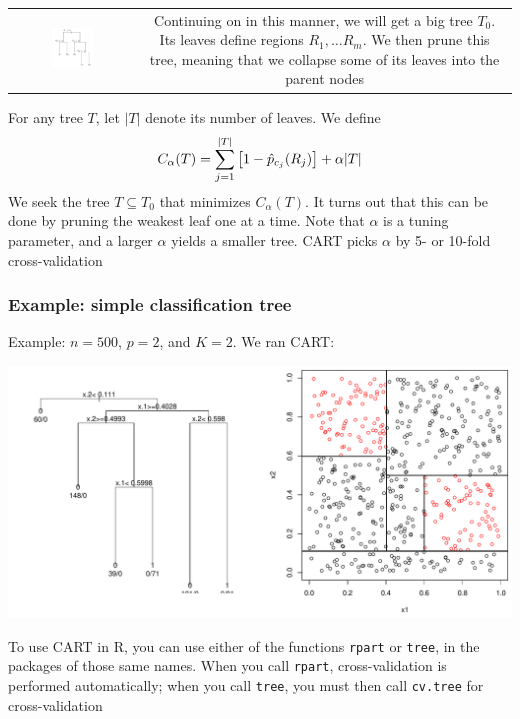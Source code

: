 \documentclass[mathserif]{beamer}
\def\red{\color[rgb]{0.8,0,0}}
\begin{document}
\begin{frame}
\frametitle{}
\bigskip
\begin{tabular}{cc}
\parbox{0.35\textwidth}{
\includegraphics[width=0.35\textwidth]{ex1-tree.png}} &
\hspace{3pt}
\parbox{0.5\textwidth}{
Continuing on in this manner, we will get a big tree $T_0$. Its leaves define regions
$R_1,\ldots R_m$. We then {\red prune} this tree, meaning that we collapse some of its 
leaves into the parent nodes}
\end{tabular}

\smallskip
\smallskip
For any tree $T$, let $|T|$ denote its number of leaves.
We define
\vspace{-3pt}
$$C_\alpha(T) = \sum_{j=1}^{|T|} \big[1-\hat{p}_{c_j}(R_j)\big] + \alpha|T|
\vspace{-3pt}$$
We seek the tree $T \subseteq T_0$ that minimizes $C_\alpha(T)$. It turns out that 
this can be done by pruning the weakest leaf one at a time. Note that $\alpha$ is 
a {\red tuning parameter}, and a larger $\alpha$ yields a smaller tree.
CART picks $\alpha$ by 5- or 10-fold cross-validation
\end{frame}

\begin{frame}
\frametitle{Example: simple classification tree}
\smallskip
Example: $n=500$, $p=2$, and $K=2$. We ran CART:

\smallskip
\smallskip
\includegraphics[width=\textwidth]{simpletree.pdf}

\smallskip
\smallskip
To use CART in R, you can use either of the functions {\tt rpart} or {\tt tree}, in the 
packages of those same names.
When you call {\tt rpart}, cross-validation is performed automatically; 
when you call {\tt tree}, you must then call {\tt cv.tree} for cross-validation
\end{frame}
\end{document}
